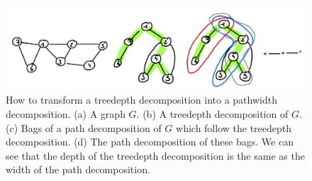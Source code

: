 \begin{figure}
    \includegraphics[width=\textwidth]{figures/treedepth-to-pathwidth.png}
    \caption{How to transform a treedepth decomposition into a pathwidth decomposition. (a) A graph $G$. (b) A treedepth decomposition of $G$. (c) Bags of a path decomposition of $G$ which follow the treedepth decomposition. (d) The path decomposition of these bags. We can see that the depth of the treedepth decomposition is the same as the width of the path decomposition.}
    \label{fig:treedepth-to-pathwidth}
\end{figure}